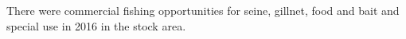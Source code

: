 There were commercial fishing opportunities for seine, gillnet, food and bait and special use in 2016 in the \regionName{} \regionType{} stock area. 